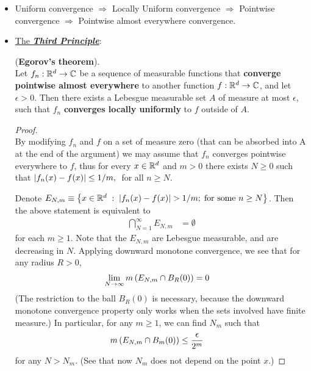 \documentclass[11pt]{article}
\begin{document}
\begin{itemize}
\item \begin{remark}  
Uniform convergence $\Rightarrow$ Locally Uniform convergence $\Rightarrow$ Pointwise convergence $\Rightarrow$ Pointwise almost everywhere convergence.
\end{remark}

\item \underline{The \textbf{\emph{Third Principle}}}: 
\begin{theorem}(\textbf{Egorov's theorem}).\\
Let $f_n : {\mathbb R}^d \rightarrow {\mathbb C}$ be a sequence of measurable functions that \textbf{converge pointwise almost everywhere} to another function $f : {\mathbb R}^d \rightarrow {\mathbb C}$, and let $\epsilon > 0$. Then there exists a Lebesgue measurable set $A$ of measure at most $\epsilon$, such that $f_n$ \textbf{converges locally uniformly} to $f$ outside of $A$.
\end{theorem}
\begin{proof} \citep{tao2011introduction}\\
By modifying $f_n$ and $f$ on a set of measure zero (that can be absorbed into A at the end of the argument) we may assume that $f_n$ converges pointwise everywhere to $f$, thus for every $x \in {\mathbb R}^d$ and $m > 0$ there exists $N \ge 0$ such that $\left\lvert f_n(x) - f(x) \right\rvert \le 1/m,\;$ for all $n \ge N$.

Denote $E_{N,m}\equiv\left\{x\in {\mathbb R}^d \;:\;   \left\lvert f_n(x) - f(x) \right\rvert > 1/m;\; \text{for some }n\ge N\right\}$. Then the above statement is equivalent to
\begin{align*}
\bigcap_{N=1}^{\infty}E_{N,m} &= \emptyset
\end{align*}
for each $m\ge 1$. Note that the $E_{N,m}$ are Lebesgue measurable, and are decreasing in $N$. Applying downward monotone convergence, we see that for any radius $R>0$,
\begin{align*}
\lim\limits_{N\rightarrow \infty}m\left(E_{N,m}\cap B_{R}(0)\right) &= 0
\end{align*} (The restriction to the ball $B_{R}(0)$ is necessary, because the downward monotone convergence property only works when the sets involved have finite measure.) In particular, for any $m \ge 1$, we can find $N_m$ such that
\begin{align*}
m\left(E_{N,m}\cap B_{m}(0)\right) &\le \frac{\epsilon}{2^{m}}
\end{align*} for any $N>N_{m}$. (See that now $N_{m}$ does not depend on the point $x$.)


\end{proof}
\end{itemize}
\end{document}
